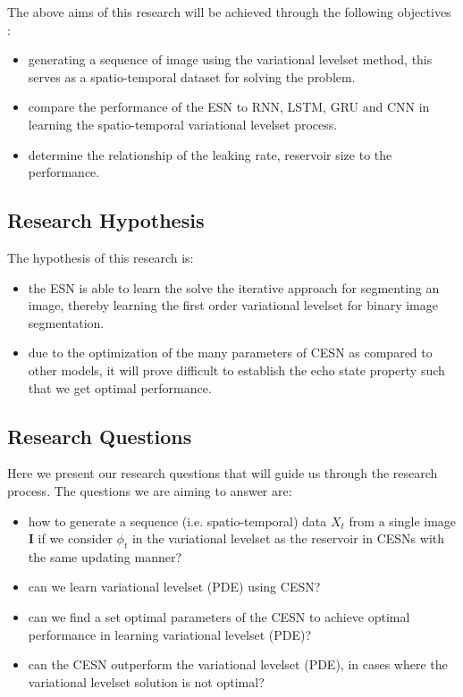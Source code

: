 \documentclass{WitsPhysicsReport}
\begin{document}
The above aims of this research will be achieved through the following objectives :
\begin{itemize}
    \item generating a sequence of image using the variational levelset method, this serves as a spatio-temporal dataset for solving the problem.
    \item compare the performance of the ESN to RNN, LSTM, GRU and CNN in learning the spatio-temporal variational levelset process.
    \item determine the relationship of the leaking rate, reservoir size to the performance. 
\end{itemize}


\subsection{Research Hypothesis}
\label{sec:research_hypothesis}
The hypothesis of this research is:
\begin{itemize}
    \item the ESN is able to learn the solve the iterative approach for segmenting an image, thereby learning the first order variational levelset for binary image segmentation.
    \item due to the optimization of the many parameters of CESN  as compared to other models, it will prove difficult to establish the echo state property such that we get optimal performance.
\end{itemize}




\subsection{Research Questions}
\label{sec:research_questions}
Here we present our research questions that will guide us through the research process. The questions we are aiming to answer are:
\begin{itemize}
    \item how to generate a sequence (i.e. spatio-temporal) data $X_{t}$ from a single image $\mathbf{I}$ if we consider $\phi_{t}$ in the variational levelset  as the reservoir in CESNs with the same updating manner?
    \item can we learn variational levelset (PDE) using CESN? 
    \item can we find a set optimal parameters of the CESN to achieve optimal performance in learning variational levelset (PDE)? 
    \item can the CESN outperform the  variational levelset (PDE), in cases where the  variational levelset solution is not optimal?
\end{itemize}
\end{document}
